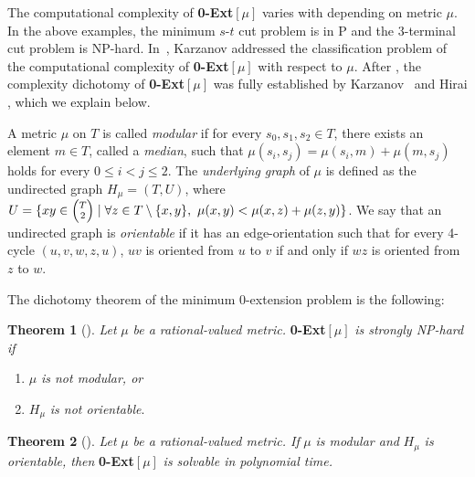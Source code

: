 \documentclass[11pt]{article}
\theoremstyle{definition}
\newtheorem{theorem}{Theorem}[section]
\begin{document}
The computational complexity of \textbf{0-Ext}$[\mu]$ varies with depending on metric $\mu$. In the above examples, the minimum $s$-$t$ cut problem is in P and the $3$-terminal cut problem is NP-hard.
In~\cite{karzanov1998}, Karzanov addressed the classification problem of the computational complexity of \textbf{0-Ext}$[\mu]$ with respect to $\mu$. After \cite{chepoi1996,karzanov2004one}, the complexity dichotomy of \textbf{0-Ext}$[\mu]$ was fully established by Karzanov~\cite{karzanov2004} and Hirai \cite{hirai2016}, which we explain below.

A metric $\mu$ on $T$ is called \textit{modular} if for every $s_0,s_1,s_2\in T$, there exists an element $m\in T$, called a \textit{median}, such that $\mu(s_i,s_j)=\mu(s_i,m)+\mu(m,s_j)$ holds for every $0\leq 
i<j\leq2$. The \textit{underlying graph} of $\mu$ is defined as the undirected graph $H_\mu=(T,U)$, where 
$U=\{xy\in{\scriptsize\begin{pmatrix}T \\
               2 \\
\end{pmatrix}}\mid \forall z\in T\setminus \{x,y\},\  \mu(x,y)<\mu(x,z)+\mu(z,y)\}$. We say that an undirected graph is \textit{orientable} if it has an edge-orientation such that for every 4-cycle $(u,v,w,z,u)$, $uv$ is oriented from $u$ to $v$ if and only if $wz$ is oriented from $z$ to $w$.

The dichotomy theorem of the minimum 0-extension problem is the following:
\begin{theorem}[\cite{karzanov2004}]
\label{thm:undirected-nph}
\textit{Let} $\mu$ \textit{be a rational-valued metric. }\textbf{0-Ext}$[\mu]$ \textit{is strongly NP-hard if}
\begin{enumerate}[label=(\roman*),ref=\roman*]
    \item $\mu$ \textit{is not modular, or}
    \label{dichotomy:not modular}
    \item $H_\mu$ \textit{is not orientable}.
    \label{dichotomy: not orientable}
\end{enumerate}
\end{theorem}
\begin{theorem}[\cite{hirai2016}]
\label{thm:undirected-p}
\textit{Let }$\mu$ \textit{be a rational-valued metric. If }$\mu$ \textit{is modular and} $H_\mu$ \textit{is orientable, then }\textbf{0-Ext}$[\mu]$ \textit{is solvable in polynomial time.}
\end{theorem}
\end{document}
